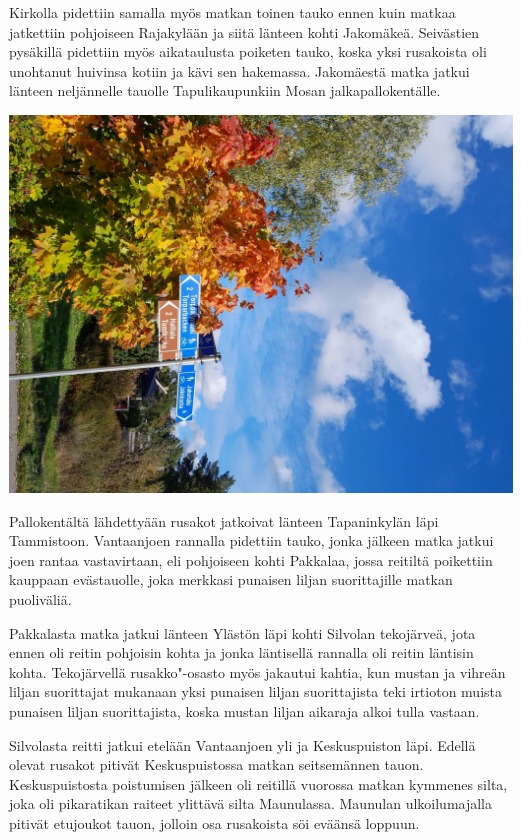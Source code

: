 \begin{multicols}{2}
Kirkolla pidettiin samalla myös matkan toinen tauko ennen kuin matkaa 
jatkettiin pohjoiseen Rajakylään ja siitä länteen kohti Jakomäkeä. 
Seivästien pysäkillä pidettiin myös aikataulusta poiketen tauko, koska yksi 
rusakoista oli unohtanut huivinsa kotiin ja kävi sen hakemassa. Jakomäestä 
matka jatkui länteen neljännelle tauolle Tapulikaupunkiin Mosan 
jalkapallokentälle.

\noindent\includegraphics[width=\linewidth]{assets/nahkaliljapunainen2.jpg}
\vspace*{0.08cm}

Pallokentältä lähdettyään rusakot jatkoivat länteen Tapaninkylän läpi 
Tammistoon. Vantaanjoen rannalla pidettiin tauko, jonka jälkeen matka jatkui 
joen rantaa vastavirtaan, eli pohjoiseen kohti Pakkalaa, jossa reitiltä 
poikettiin kauppaan evästauolle, joka merkkasi punaisen liljan suorittajille 
matkan puoliväliä.

Pakkalasta matka jatkui länteen Ylästön läpi kohti Silvolan tekojärveä, 
jota ennen oli reitin pohjoisin kohta ja jonka läntisellä rannalla oli reitin 
läntisin kohta. Tekojärvellä rusakko"-osasto myös jakautui kahtia, kun 
mustan ja vihreän liljan suorittajat mukanaan yksi punaisen liljan 
suorittajista teki irtioton muista punaisen liljan suorittajista, koska mustan 
liljan aikaraja alkoi tulla vastaan. 


Silvolasta reitti jatkui etelään Vantaanjoen yli ja Keskuspuiston läpi. 
Edellä olevat rusakot pitivät Keskuspuistossa matkan seitsemännen tauon. 
Keskuspuistosta poistumisen jälkeen oli reitillä vuorossa matkan kymmenes 
silta, joka oli pikaratikan raiteet ylittävä silta Maunulassa. Maunulan 
ulkoilumajalla pitivät etujoukot tauon, jolloin osa rusakoista söi eväänsä 
loppuun.


\end{multicols}
